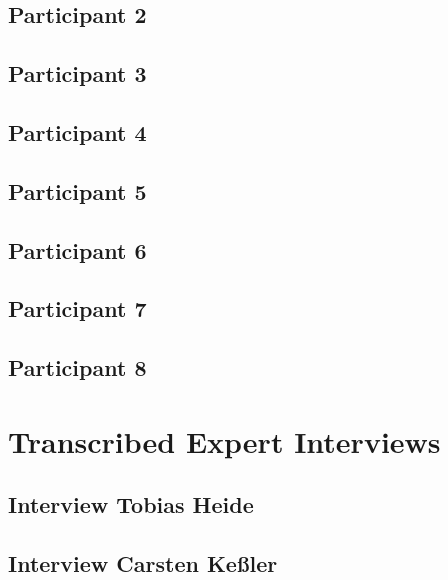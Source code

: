 \subsection{Participant 2}
  

\subsection{Participant 3}
  

\subsection{Participant 4}
  

\subsection{Participant 5}
  

\subsection{Participant 6}
  

\subsection{Participant 7}
  
  
\subsection{Participant 8}
  

\section{Transcribed Expert Interviews}

\subsection{Interview Tobias Heide}
  

\subsection{Interview Carsten Ke{\ss}ler}
  
  